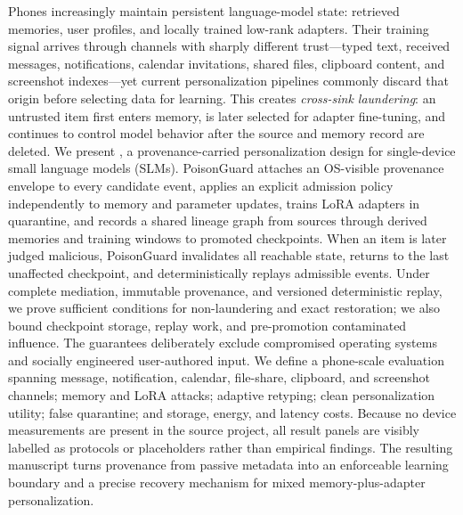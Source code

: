 Phones increasingly maintain persistent language-model state: retrieved memories, user profiles, and locally trained low-rank adapters. Their training signal arrives through channels with sharply different trust---typed text, received messages, notifications, calendar invitations, shared files, clipboard content, and screenshot indexes---yet current personalization pipelines commonly discard that origin before selecting data for learning. This creates \emph{cross-sink laundering}: an untrusted item first enters memory, is later selected for adapter fine-tuning, and continues to control model behavior after the source and memory record are deleted. We present \PG, a provenance-carried personalization design for single-device small language models (SLMs). PoisonGuard attaches an OS-visible provenance envelope to every candidate event, applies an explicit admission policy independently to memory and parameter updates, trains LoRA adapters in quarantine, and records a shared lineage graph from sources through derived memories and training windows to promoted checkpoints. When an item is later judged malicious, PoisonGuard invalidates all reachable state, returns to the last unaffected checkpoint, and deterministically replays admissible events. Under complete mediation, immutable provenance, and versioned deterministic replay, we prove sufficient conditions for non-laundering and exact restoration; we also bound checkpoint storage, replay work, and pre-promotion contaminated influence. The guarantees deliberately exclude compromised operating systems and socially engineered user-authored input. We define a phone-scale evaluation spanning message, notification, calendar, file-share, clipboard, and screenshot channels; memory and LoRA attacks; adaptive retyping; clean personalization utility; false quarantine; and storage, energy, and latency costs. Because no device measurements are present in the source project, all result panels are visibly labelled as protocols or placeholders rather than empirical findings. The resulting manuscript turns provenance from passive metadata into an enforceable learning boundary and a precise recovery mechanism for mixed memory-plus-adapter personalization.
